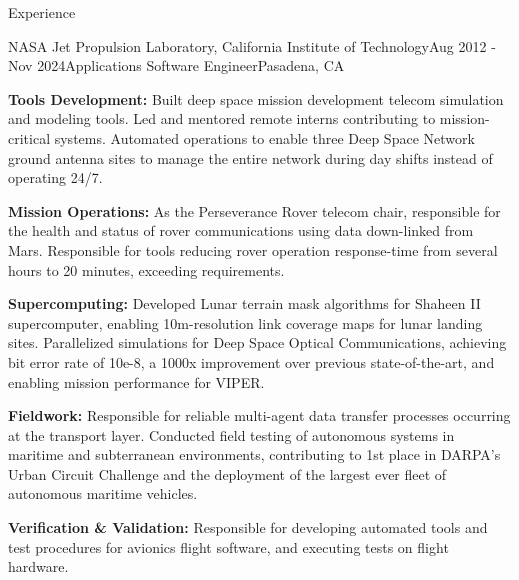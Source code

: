 \documentclass{resume} %
\begin{document}
\begin{rSection}{Experience}
\begin{rSubsection}{NASA Jet Propulsion Laboratory, California Institute of Technology}{Aug 2012 - Nov 2024}{Applications Software Engineer}{Pasadena, CA}


\item {\bf{Tools Development:}}
Built deep space mission development telecom simulation and modeling tools. Led and mentored remote interns contributing to mission-critical systems. Automated operations to enable three Deep Space Network ground antenna sites to manage the entire network during day shifts instead of operating 24\slash 7.


\item {\bf{Mission Operations:}}
As the Perseverance Rover telecom chair, responsible for the health and status of rover communications using data down-linked from Mars. Responsible for tools reducing rover operation response-time from several hours to 20 minutes, exceeding requirements. 


\item {\bf{Supercomputing:}} 
Developed Lunar terrain mask algorithms for Shaheen II supercomputer, enabling 10m-resolution link coverage maps for lunar landing sites. Parallelized simulations for Deep Space Optical Communications, achieving bit error rate of 10e-8, a 1000x improvement over previous state-of-the-art, and enabling mission performance for VIPER. 
 

\item {\bf{Fieldwork:}} 
Responsible for reliable multi-agent data transfer processes occurring at the transport layer. Conducted field testing of autonomous systems in maritime and subterranean environments, contributing to 1st place in DARPA’s Urban Circuit Challenge and the deployment of the largest ever fleet of autonomous maritime vehicles. 


\item {\bf{Verification \& Validation:}} 
Responsible for developing automated tools and test procedures for avionics flight software, and executing tests on flight hardware. 


\end{rSubsection}






\end{rSection}
\end{document}
